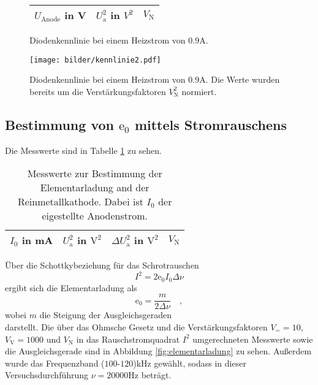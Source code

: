 	\begin{figure}[htbp]
	\begin{minipage}{0.4\textwidth}
			\centering
			\begin{tabular}{ccc}
				\toprule \midrule
				$U_\text{Anode}$ in V & $U_\text{a}^2$ in $V^2$
				& $V_\text{N}$\\
				\midrule
				
				\midrule \bottomrule
			\end{tabular}
			\caption{Diodenkennlinie bei einem Heizstrom von
			$0.9$A.}
			\label{tab:kennlinie2}
	\end{minipage}
	\hfill
	\begin{minipage}{0.6\textwidth}
			\centering
			\texttt{[image: bilder/kennlinie2.pdf]}
			\caption{Diodenkennlinie bei einem Heizstrom von
			$0.9$A. Die Werte wurden bereits um die
            Verstärkungsfaktoren $V_\text{N}^2$ normiert.}
			\label{fig:kennlinie2}
	\end{minipage}
	\end{figure}



\clearpage
\subsection{Bestimmung von $\text{e}_0$ mittels Stromrauschens}

	Die Messwerte sind in Tabelle \ref{tab:elementarladung_messwerte}
	zu sehen.
	\begin{table}[h]
	\centering
		\begin{tabular}{cccc}
		\toprule
		\midrule
			$I_0$ in mA & $U^2_\text{a}$ in $\text{V}^2$ &
			$\Delta U_\text{a}^2$ in $\text{V}^2$ & $V_\text{N}$ \\
			\midrule
			
			\midrule
			\bottomrule
		\end{tabular}
		\caption{Messwerte zur Bestimmung der Elementarladung
		and der Reinmetallkathode. Dabei ist $I_0$ der eigestellte
		Anodenstrom.}
		\label{tab:elementarladung_messwerte}
	\end{table}

	Über die Schottkybeziehung für das Schrotrauschen
	\begin{equation}
		I^2 = 2 \text{e}_0 I_0 \Delta \nu
	\end{equation}
	ergibt sich die Elementarladung als
	\begin{equation}
	\text{e}_0 = \frac{m}{2 \Delta \nu} \quad ,
	\end{equation}
	wobei $m$ die Steigung der Ausgleichsgeraden
	\begin{equation}
	
	\end{equation}
	darstellt. Die über das Ohmsche Gesetz und die
	Verstärkungsfaktoren $V_= =10$, $V_\text{V}=1000$ und
	$V_\text{N}$ in das Rauschstromquadrat $I^2$ umgerechneten
	Messwerte sowie die Ausgleichsgerade sind in Abbildung
	\ref{fig:elementarladung} zu sehen. Außerdem wurde das
	Frequenzband ($100$-$120$)kHz gewählt, sodass in dieser
	Versuchsdurchführung $\nu = 20000$Hz beträgt.

